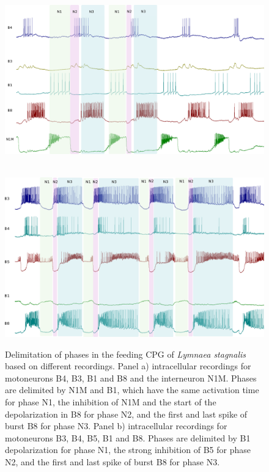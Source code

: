 \begin{figure}[bth!]
	\centering
	\begin{minipage}[b]{0.7\textwidth}
		\\
		\centering
		\includegraphics[width=\textwidth]{img/invariants/example_phases_1.pdf}
	\end{minipage}
	\vspace{20pt}
	\begin{minipage}[b]{0.7\textwidth}
		\\
		\centering
		\includegraphics[width=\textwidth]{img/invariants/example_phases_2.pdf}
	\end{minipage}
	\caption{Delimitation of phases in the feeding CPG of \textit{Lymnaea stagnalis} based on different recordings. Panel a) intracellular recordings for motoneurons B4, B3, B1 and B8 and the interneuron N1M. Phases are delimited by N1M and B1, which have the same activation time for phase N1, the inhibition of N1M and the start of the depolarization in B8 for phase N2, and the first and last spike of burst B8 for phase N3. Panel b) intracellular recordings for motoneurons B3, B4, B5, B1 and B8. Phases are delimited by B1 depolarization for phase N1, the strong inhibition of B5 for phase N2, and the first and last spike of burst B8 for phase N3.}
	\label{fig:example lymnaea phases recording}
\end{figure}

